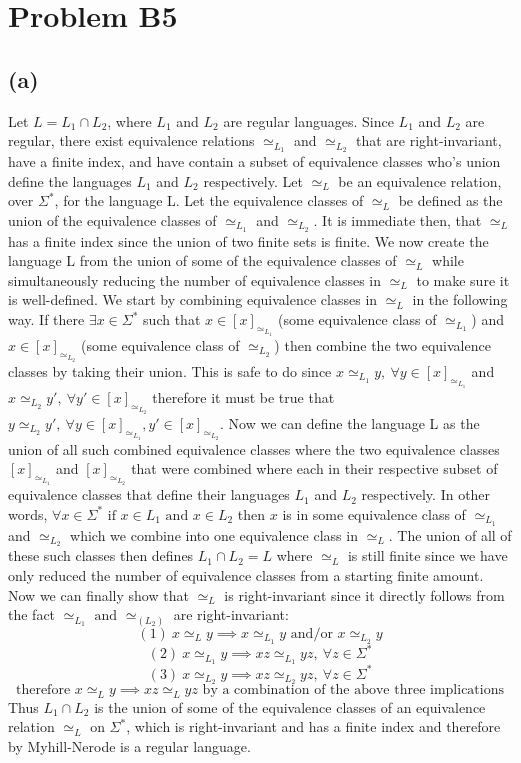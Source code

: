 \documentclass[12pt]{article}
\begin{document}
\pagestyle{plain}

\section*{Problem B5}
\subsection*{(a)}
Let $L = L_1 \cap L_2$, where $L_1$ and $L_2$ are regular languages. Since
$L_1$ and $L_2$ are regular, there exist equivalence relations $\simeq_{L_1}$
and $\simeq_{L_2}$ that are right-invariant, have a finite index, and have
contain a subset of equivalence classes who's union define the languages
$L_1$ and $L_2$ respectively. Let $\simeq_L$ be an equivalence relation, over
$\Sigma^*$, for the language L. Let the equivalence classes of $\simeq_L$
be defined as the union of the equivalence classes of $\simeq_{L_1}$ and
$\simeq_{L_2}$. It is immediate then, that $\simeq_L$ has a finite index since
the union of two finite sets is finite. We now create the language L from the
union of some of the equivalence classes of $\simeq_L$ while simultaneously
reducing the number of equivalence classes in $\simeq_L$ to make sure it is
well-defined. We start by combining equivalence classes in $\simeq_L$ in the
following way. If there $\exists x \in \Sigma^*$ such that
$x \in [x]_{\simeq_{L_1}}$ (some equivalence class of $\simeq_{L_1}$) and
$x \in [x]_{\simeq_{L_2}}$ (some equivalence class of $\simeq_{L_2}$)
then combine the two equivalence classes by taking their union. This is safe to
do since $x \simeq_{L_1} y,\ \forall y \in [x]_{\simeq_{L_1}}$ and
$x \simeq_{L_2} y',\ \forall y' \in [x]_{\simeq_{L_2}}$ therefore it must be true
that $y \simeq_{L_2} y',\ \forall y \in [x]_{\simeq_{L_1}},
y' \in [x]_{\simeq_{L_2}}$. Now we can define the language L as the union of all
such combined equivalence classes where the two equivalence classes
$[x]_{\simeq_{L_1}}$ and $[x]_{\simeq_{L_2}}$ that were combined where each in
their respective subset of equivalence classes that define their languages
$L_1$ and $L_2$ respectively. In other words, $\forall x \in \Sigma^*
\text{ if } x \in L_1 \text{ and } x \in L_2$ then $x$ is in some equivalence
class of $\simeq_{L_1}$ and $\simeq_{L_2}$ which we combine into one equivalence
class in $\simeq_L$. The union of all of these such classes then defines
$L_1 \cap L_2 = L$ where $\simeq_L$ is still finite since we have only reduced
the number of equivalence classes from a starting finite amount. Now we can
finally show that $\simeq_L$ is right-invariant since it directly follows from
the fact $\simeq_{L_1} \text{ and } \simeq_(L_2)$ are right-invariant:
$$(1)\ x \simeq_L y \implies x \simeq_{L_1} y \text{ and/or } x \simeq_{L_2} y$$
$$(2)\ x \simeq_{L_1} y \implies xz \simeq_{L_1} yz,\ \forall z \in \Sigma^*$$
$$(3)\ x \simeq_{L_2} y \implies xz \simeq_{L_2} yz,\ \forall z \in \Sigma^*$$
$$\text{therefore } x \simeq_L y \implies xz \simeq_L yz \text{ by a combination
of the above three implications}$$
Thus $L_1 \cap L_2$ is the union of some of the equivalence classes of an
equivalence relation $\simeq_L$ on $\Sigma^*$, which is right-invariant and has
a finite index and therefore by Myhill-Nerode is a regular language.
\end{document}
